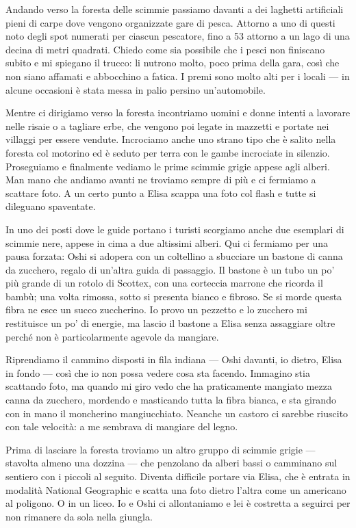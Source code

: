 Andando verso la foresta delle scimmie passiamo davanti a dei laghetti artificiali pieni di carpe dove vengono organizzate gare di pesca. Attorno a uno di questi noto degli spot numerati per ciascun pescatore, fino a 53 attorno a un lago di una decina di metri quadrati. Chiedo come sia possibile che i pesci non finiscano subito e mi spiegano il trucco: li nutrono molto, poco prima della gara, così che non siano affamati e abbocchino a fatica. I premi sono molto alti per i locali — in alcune occasioni è stata messa in palio persino un'automobile.

Mentre ci dirigiamo verso la foresta incontriamo uomini e donne intenti a lavorare nelle risaie o a tagliare erbe, che vengono poi legate in mazzetti e portate nei villaggi per essere vendute. Incrociamo anche uno strano tipo che è salito nella foresta col motorino ed è seduto per terra con le gambe incrociate in silenzio. Proseguiamo e finalmente vediamo le prime scimmie grigie appese agli alberi. Man mano che andiamo avanti ne troviamo sempre di più e ci fermiamo a scattare foto. A un certo punto a Elisa scappa una foto col flash e tutte si dileguano spaventate.

In uno dei posti dove le guide portano i turisti scorgiamo anche due esemplari di scimmie nere, appese in cima a due altissimi alberi. Qui ci fermiamo per una pausa forzata: Oshi si adopera con un coltellino a sbucciare un bastone di canna da zucchero, regalo di un'altra guida di passaggio. Il bastone è un tubo un po' più grande di un rotolo di Scottex, con una corteccia marrone che ricorda il bambù; una volta rimossa, sotto si presenta bianco e fibroso. Se si morde questa fibra ne esce un succo zuccherino. Io provo un pezzetto e lo zucchero mi restituisce un po' di energie, ma lascio il bastone a Elisa senza assaggiare oltre perché non è particolarmente agevole da mangiare.

Riprendiamo il cammino disposti in fila indiana — Oshi davanti, io dietro, Elisa in fondo — così che io non possa vedere cosa sta facendo. Immagino stia scattando foto, ma quando mi giro vedo che ha praticamente mangiato mezza canna da zucchero, mordendo e masticando tutta la fibra bianca, e sta girando con in mano il moncherino mangiucchiato. Neanche un castoro ci sarebbe riuscito con tale velocità: a me sembrava di mangiare del legno.

Prima di lasciare la foresta troviamo un altro gruppo di scimmie grigie — stavolta almeno una dozzina — che penzolano da alberi bassi o camminano sul sentiero con i piccoli al seguito. Diventa difficile portare via Elisa, che è entrata in modalità National Geographic e scatta una foto dietro l'altra come un americano al poligono. O in un liceo. Io e Oshi ci allontaniamo e lei è costretta a seguirci per non rimanere da sola nella giungla.

